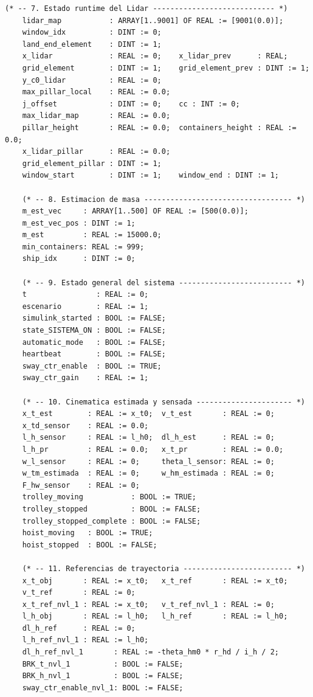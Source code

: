 \documentclass[12pt, a4paper]{article}
\begin{document}
\begin{lstlisting}[style=st, basicstyle=\ttfamily\scriptsize,
    caption={Variables globales (\texttt{GVL}) del proyecto CODESYS, organizadas por grupo funcional.},
    label=lst:gvl]
    (* -- 7. Estado runtime del Lidar ---------------------------- *)
    lidar_map           : ARRAY[1..9001] OF REAL := [9001(0.0)];
    window_idx          : DINT := 0;
    land_end_element    : DINT := 1;
    x_lidar             : REAL := 0;    x_lidar_prev      : REAL;
    grid_element        : DINT := 1;    grid_element_prev : DINT := 1;
    y_c0_lidar          : REAL := 0;
    max_pillar_local    : REAL := 0.0;
    j_offset            : DINT := 0;    cc : INT := 0;
    max_lidar_map       : REAL := 0.0;
    pillar_height       : REAL := 0.0;  containers_height : REAL := 0.0;
    x_lidar_pillar      : REAL := 0.0;
    grid_element_pillar : DINT := 1;
    window_start        : DINT := 1;    window_end : DINT := 1;

    (* -- 8. Estimacion de masa ---------------------------------- *)
    m_est_vec     : ARRAY[1..500] OF REAL := [500(0.0)];
    m_est_vec_pos : DINT := 1;
    m_est         : REAL := 15000.0;
    min_containers: REAL := 999;
    ship_idx      : DINT := 0;

    (* -- 9. Estado general del sistema -------------------------- *)
    t                : REAL := 0;
    escenario        : REAL := 1;
    simulink_started : BOOL := FALSE;
    state_SISTEMA_ON : BOOL := FALSE;
    automatic_mode   : BOOL := FALSE;
    heartbeat        : BOOL := FALSE;
    sway_ctr_enable  : BOOL := TRUE;
    sway_ctr_gain    : REAL := 1;

    (* -- 10. Cinematica estimada y sensada ---------------------- *)
    x_t_est        : REAL := x_t0;  v_t_est       : REAL := 0;
    x_td_sensor    : REAL := 0.0;
    l_h_sensor     : REAL := l_h0;  dl_h_est      : REAL := 0;
    l_h_pr         : REAL := 0.0;   x_t_pr        : REAL := 0.0;
    w_l_sensor     : REAL := 0;     theta_l_sensor: REAL := 0;
    w_tm_estimada  : REAL := 0;     w_hm_estimada : REAL := 0;
    F_hw_sensor    : REAL := 0;
    trolley_moving           : BOOL := TRUE;
    trolley_stopped          : BOOL := FALSE;
    trolley_stopped_complete : BOOL := FALSE;
    hoist_moving   : BOOL := TRUE;
    hoist_stopped  : BOOL := FALSE;

    (* -- 11. Referencias de trayectoria ------------------------- *)
    x_t_obj       : REAL := x_t0;   x_t_ref       : REAL := x_t0;
    v_t_ref       : REAL := 0;
    x_t_ref_nvl_1 : REAL := x_t0;   v_t_ref_nvl_1 : REAL := 0;
    l_h_obj       : REAL := l_h0;   l_h_ref       : REAL := l_h0;
    dl_h_ref      : REAL := 0;
    l_h_ref_nvl_1 : REAL := l_h0;
    dl_h_ref_nvl_1       : REAL := -theta_hm0 * r_hd / i_h / 2;
    BRK_t_nvl_1          : BOOL := FALSE;
    BRK_h_nvl_1          : BOOL := FALSE;
    sway_ctr_enable_nvl_1: BOOL := FALSE;


\end{lstlisting}
\end{document}
